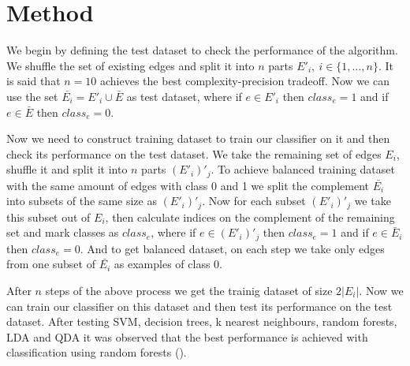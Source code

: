 \documentclass{llncs}
\begin{document}
\section{Method}
%
We begin by defining the test dataset to check the performance of the algorithm. We shuffle the set of existing edges and split it into $n$ parts $E'_i, \ i \in \{1, \ldots, n\}$. It is said that $n = 10$ achieves the best complexity-precision tradeoff. Now we can use the set $\bar{E_i} = E'_i \cup \bar{E}$ as test dataset, where if $e \in E'_i$ then $class_e = 1$ and if $e \in \bar{E}$ then $class_e = 0$.

Now we need to construct training dataset to train our classifier on it and then check its performance on the test dataset. We take the remaining set of edges $E_i$, shuffle it and split it into $n$ parts $(E'_i)'_j$. To achieve balanced training dataset with the same amount of edges with class 0 and 1 we split the complement $\bar{E_i}$ into subsets of the same size as $(E'_i)'_j$. Now for each subset $(E'_i)'_j$ we take this subset out of $E_i$, then calculate indices on the complement of the remaining set and mark classes as $class_e$, where if $e \in (E'_i)'_j$ then $class_e = 1$ and if $e \in \bar{E}_i$ then $class_e = 0$. And to get balanced dataset, on each step we take only edges from one subset of $\bar{E_i}$ as examples of class 0.

After $n$ steps of the above process we get the trainig dataset of size $2 |E_i|$. Now we can train our classifier on this dataset and then test its performance on the test dataset. After testing SVM, decision trees, k nearest neighbours, random forests, LDA and QDA it was observed that the best performance is achieved with classification using random forests ().
%
\end{document}

